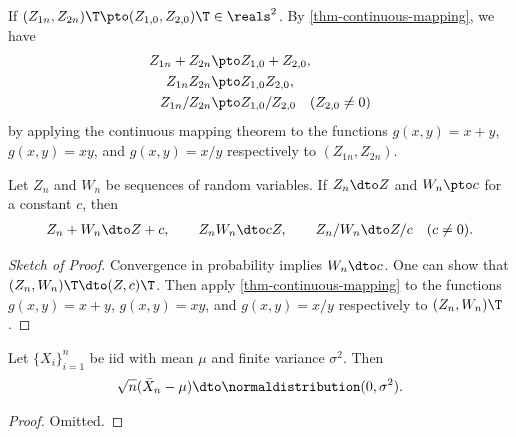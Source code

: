 \documentclass[a4paper,12pt]{article}
\begin{document}
\begin{example}
	If $(Z_{1n},Z_{2n})\T\pto (Z_{1,0},Z_{2,0})\T\in\reals^2$.
	By \autoref{thm-continuous-mapping}, we have
	\begin{align}
		Z_{1n}+Z_{2n}&\pto Z_{1,0}+Z_{2,0}, \\
		Z_{1n}Z_{2n}&\pto Z_{1,0}Z_{2,0}, \\
		Z_{1n}/Z_{2n}&\pto Z_{1,0}/Z_{2,0}\quad(Z_{2,0}\neq0)
	\end{align}
	by applying the continuous mapping theorem to the functions
	$g(x,y)=x+y$, $g(x,y)=xy$, and $g(x,y)=x/y$ respectively to $(Z_{1n},Z_{2n})$.
\end{example}

\begin{theorem}\label{thm-slutsky}
	Let $Z_n$ and $W_n$ be sequences of random variables.
	If $Z_n\dto Z$ and $W_n\pto c$ for a constant $c$, then
	\begin{align}
		Z_n+W_n\dto Z+c,
		\qquad
		Z_nW_n\dto cZ,
		\qquad
		Z_n/W_n\dto Z/c\quad(c\neq0).
	\end{align}
\end{theorem}
\begin{proof}[Sketch of Proof]
	Convergence in probability implies $W_n\dto c$.
	One can show that $(Z_n,W_n)\T\dto(Z,c)\T$.
	Then apply \autoref{thm-continuous-mapping} to the functions $g(x,y)=x+y$, $g(x,y)=xy$, and $g(x,y)=x/y$ respectively to $(Z_n,W_n)\T$.
\end{proof}

\begin{theorem}\label{thm-clt}
	Let $\{X_i\}_{i=1}^{n}$ be \gls{iid} with mean $\mu$ and finite variance $\sigma^2$.
	Then
	\begin{align}
		\sqrt{n}(\bar X_n-\mu)\dto\normaldistribution(0,\sigma^2).
	\end{align}
\end{theorem}
\begin{proof}
	Omitted.
\end{proof}
\end{document}
